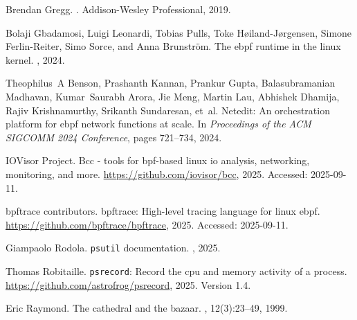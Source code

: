 \documentclass[10pt]{article}
\begin{document}
\begin{thebibliography}{1}

Brendan Gregg.
.
\newblock Addison-Wesley Professional, 2019.

Bolaji Gbadamosi, Luigi Leonardi, Tobias Pulls, Toke H{\o}iland-J{\o}rgensen,
  Simone Ferlin-Reiter, Simo Sorce, and Anna Brunstr{\"o}m.
\newblock The ebpf runtime in the linux kernel.
, 2024.

Theophilus~A Benson, Prashanth Kannan, Prankur Gupta, Balasubramanian Madhavan,
  Kumar~Saurabh Arora, Jie Meng, Martin Lau, Abhishek Dhamija, Rajiv
  Krishnamurthy, Srikanth Sundaresan, et~al.
\newblock Netedit: An orchestration platform for ebpf network functions at
  scale.
\newblock In {\em Proceedings of the ACM SIGCOMM 2024 Conference}, pages
  721--734, 2024.

IOVisor Project.
\newblock Bcc - tools for bpf-based linux io analysis, networking, monitoring,
  and more.
\newblock \url{https://github.com/iovisor/bcc}, 2025.
\newblock Accessed: 2025-09-11.

bpftrace contributors.
\newblock bpftrace: High-level tracing language for linux ebpf.
\newblock \url{https://github.com/bpftrace/bpftrace}, 2025.
\newblock Accessed: 2025-09-11.

Giampaolo Rodola.
\newblock \texttt{psutil} documentation.
, 2025.

Thomas Robitaille.
\newblock \texttt{psrecord}: Record the cpu and memory activity of a process.
\newblock \url{https://github.com/astrofrog/psrecord}, 2025.
\newblock Version 1.4.

Eric Raymond.
\newblock The cathedral and the bazaar.
, 12(3):23--49, 1999.

\end{thebibliography}
\end{document}
